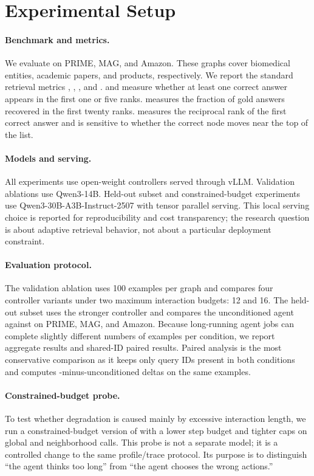 \section{Experimental Setup}
\paragraph{Benchmark and metrics.}
We evaluate on \stark PRIME, MAG, and Amazon. These graphs cover biomedical entities, academic papers, and products, respectively. We report the standard retrieval metrics , , , and \mrr.  and  measure whether at least one correct answer appears in the first one or five ranks.  measures the fraction of gold answers recovered in the first twenty ranks. \mrr measures the reciprocal rank of the first correct answer and is sensitive to whether the correct node moves near the top of the list.

\paragraph{Models and serving.}
All experiments use open-weight \qwen controllers \cite{yang2025qwen3} served through vLLM. Validation ablations use Qwen3-14B. Held-out subset and constrained-budget experiments use Qwen3-30B-A3B-Instruct-2507 with tensor parallel serving. This local serving choice is reported for reproducibility and cost transparency; the research question is about adaptive retrieval behavior, not about a particular deployment constraint.

\paragraph{Evaluation protocol.}
The validation ablation uses 100 examples per graph and compares four controller variants under two maximum interaction budgets: 12 and 16. The held-out subset uses the stronger controller and compares the unconditioned agent against \tb on PRIME, MAG, and Amazon. Because long-running agent jobs can complete slightly different numbers of examples per condition, we report aggregate results and shared-ID paired results. Paired analysis is the most conservative comparison as it keeps only query IDs present in both conditions and computes \tb-minus-unconditioned deltas on the same examples.

\paragraph{Constrained-budget probe.}
To test whether degradation is caused mainly by excessive interaction length, we run a constrained-budget version of \tb with a lower step budget and tighter caps on global and neighborhood calls. This probe is not a separate model; it is a controlled change to the same profile/trace protocol. Its purpose is to distinguish ``the agent thinks too long'' from ``the agent chooses the wrong actions.''

